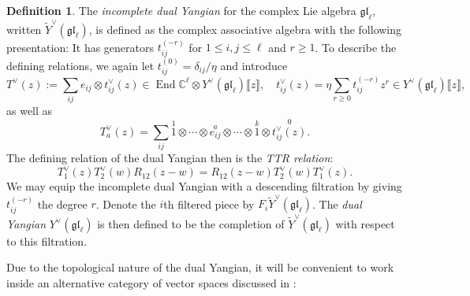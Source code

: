 \documentclass[11pt]{report}
\theoremstyle{definition}
\newtheorem{definition}[theorem]{Definition}
\theoremstyle{remark}
\theoremstyle{remark}
\newcommand{\End}{\operatorname{End}}
\newcommand{\C}{\mathbb{C}}
\begin{document}
\begin{definition}
The \emph{incomplete dual Yangian} for the complex Lie algebra $\mathfrak{gl}_\ell$, written $\widetilde Y^\vee(\mathfrak{gl}_\ell)$, is defined as the complex associative algebra with the following presentation: It has generators $t_{ij}^{(-r)}$ for $1 \leq i,j \leq \ell$ and $r \geq 1$. To describe the defining relations, we again let $t_{ij}^{(0)} = \delta_{ij}/\eta$ and introduce
\begin{equation*}
T^\vee(z) := \sum_{ij} e_{ij} \otimes t_{ij}^\vee(z) \in \End \C^\ell \otimes Y^\vee(\mathfrak{gl}_\ell)\llbracket z \rrbracket, \quad t_{ij}^\vee(z) = \eta \sum_{r \geq 0} t_{ij}^{(-r)} z^r \in Y^\vee(\mathfrak{gl}_\ell)\llbracket z \rrbracket,
\end{equation*}
as well as
\begin{equation*}
T_a^\vee(z) = \sum_{ij} \overset{1}{1} \otimes \cdots \otimes \overset{a}{e_{ij}} \otimes \cdots \otimes \overset{k}{1} \otimes \overset{0}{t_{ij}^\vee(z)}.
\end{equation*}
The defining relation of the dual Yangian then is the \emph{TTR relation}:
\begin{equation}\label{equation:TTRRelation}
T_1^\vee(z) T_2^\vee(w) R_{12}(z-w) = R_{12}(z-w) T_2^\vee(w) T_1^\vee(z).
\end{equation}
We may equip the incomplete dual Yangian with a descending filtration by giving $t_{ij}^{(-r)}$ the degree $r$. Denote the $i$th filtered piece by $F_i \widetilde{Y}^\vee(\mathfrak{gl}_\ell)$. The \emph{dual Yangian} $Y^\vee(\mathfrak{gl}_\ell)$ is then defined to be the completion of $\widetilde{Y}^\vee(\mathfrak{gl}_\ell)$ with respect to this filtration.
\end{definition}

Due to the topological nature of the dual Yangian, it will be convenient to work inside an alternative category of vector spaces discussed in \cite{article:costello:2013}:
\end{document}

